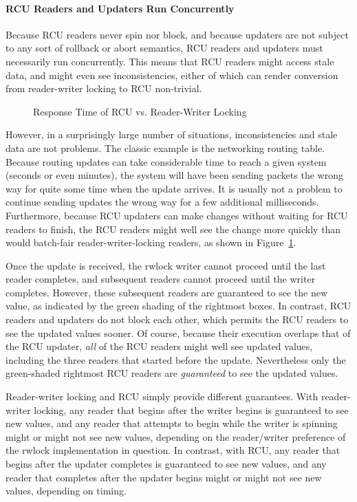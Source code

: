 \paragraph{RCU Readers and Updaters Run Concurrently}

Because RCU readers never spin nor block, and because updaters are not
subject to any sort of rollback or abort semantics, RCU readers and
updaters must necessarily run concurrently.
This means that RCU readers might access stale data, and might even
see inconsistencies, either of which can render conversion from reader-writer
locking to RCU non-trivial.

\begin{figure}[tb]
\centering
{}
\caption{Response Time of RCU vs. Reader-Writer Locking}
\label{fig:defer:Response Time of RCU vs. Reader-Writer Locking}
\end{figure}

However, in a surprisingly large number of situations, inconsistencies and
stale data are not problems.
The classic example is the networking routing table.
Because routing updates can take considerable time to reach a given
system (seconds or even minutes), the system will have been sending
packets the wrong way for quite some time when the update arrives.
It is usually not a problem to continue sending updates the wrong
way for a few additional milliseconds.
Furthermore, because RCU updaters can make changes without waiting for
RCU readers to finish,
the RCU readers might well see the change more quickly than would
batch-fair
reader-writer-locking readers, as shown in
Figure~\ref{fig:defer:Response Time of RCU vs. Reader-Writer Locking}.

Once the update is received, the rwlock writer cannot proceed until the
last reader completes, and subsequent readers cannot proceed until the
writer completes.
However, these subsequent readers are guaranteed to see the new value,
as indicated by the green shading of the rightmost boxes.
In contrast, RCU readers and updaters do not block each other, which permits
the RCU readers to see the updated values sooner.
Of course, because their execution overlaps that of the RCU updater,
\emph{all} of the RCU readers might well see updated values, including
the three readers that started before the update.
Nevertheless only the green-shaded rightmost RCU readers
are \emph{guaranteed} to see the updated values.

Reader-writer locking and RCU simply provide different guarantees.
With reader-writer locking, any reader that begins after the writer begins
is guaranteed to see new values, and any reader that attempts to
begin while the writer is spinning might or might not see new values,
depending on the reader/writer preference of the rwlock implementation in
question.
In contrast, with RCU, any reader that begins after the updater completes
is guaranteed to see new values, and any reader that completes after the
updater begins might or might not see new values, depending on timing.

